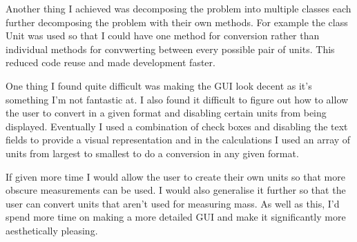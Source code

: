 \documentclass[a4paper]{article}
\begin{document}
Another thing I achieved was decomposing the problem into multiple classes each further decomposing the problem with their own methods. For example 
the class Unit was used so that I could have one method for conversion rather than individual methods for convwerting between every possible pair of 
units. This reduced code reuse and made development faster.

One thing I found quite difficult was making the GUI look decent as it's something I'm not fantastic at. I also found it difficult to figure out how 
to allow the user to convert in a given format and disabling certain units from being displayed. Eventually I used a combination of check boxes and 
disabling the text fields to provide a visual representation and in the calculations I used an array of units from largest to smallest to do a 
conversion in any given format.

If given more time I would allow the user to create their own units so that more obscure measurements can be used. I would also generalise it further 
so that the user can convert units that aren't used for measuring mass. As well as this, I'd spend more time on making a more detailed GUI and make it 
significantly more aesthetically pleasing.
\end{document}
